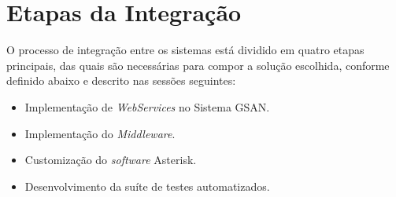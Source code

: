 \section{Etapas da Integração}
O processo de integração entre os sistemas está dividido em quatro etapas principais, das quais são necessárias para compor a solução escolhida, conforme definido abaixo e descrito nas sessões seguintes:

\begin{itemize}
	\item Implementação de \textit{WebServices} no Sistema GSAN. 
	\item Implementação do \textit{Middleware}.
	\item Customização do \textit{software} Asterisk.
	\item Desenvolvimento da suíte de testes automatizados.
\end{itemize}
